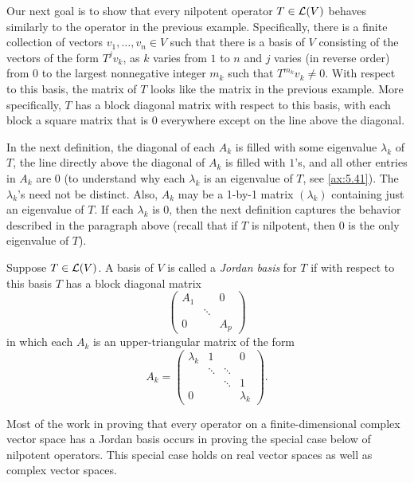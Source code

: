 Our next goal is to show that every nilpotent operator $T\in\mathcal{L}(V)$ behaves
similarly to the operator in the previous example. Specifically, there is a
finite collection of vectors $v_1,\dots,v_n\in V$ such that there is a basis of
$V$ consisting of the vectors of the form $T^jv_k$, as $k$ varies from $1$ to
$n$ and $j$ varies (in reverse order) from $0$ to the largest nonnegative
integer $m_k$ such that $T^{m_k}v_k\ne0$. With respect to this basis, the matrix
of $T$ looks like the matrix in the previous example. More specifically, $T$
has a block diagonal matrix with respect to this basis, with each block a
square matrix that is $0$ everywhere except on the line above the diagonal.

In the next definition, the diagonal of each $A_k$ is filled with some
eigenvalue $\lambda_k$ of $T$, the line directly above the diagonal of $A_k$ is
filled with $1$'s, and all other entries in $A_k$ are $0$ (to understand why
each $\lambda_k$ is an eigenvalue of $T$, see \ref{ax:5.41}). The
$\lambda_k$'s need not be distinct. Also, $A_k$ may be a 1-by-1 matrix
$(\lambda_k)$ containing just an eigenvalue of $T$. If each $\lambda_k$ is $0$,
then the next definition captures the behavior described in the paragraph above
(recall that if $T$ is nilpotent, then $0$ is the only eigenvalue of $T$).

\begin{definition}\label{ax:8.44}
Suppose $T\in\mathcal{L}(V)$. A basis of $V$ is called a \emph{Jordan basis} for $T$
if with respect to this basis $T$ has a block diagonal matrix
\[ \begin{pmatrix}
A_1 & & 0\\
& \ddots & \\
0 & & A_p
\end{pmatrix} \]
in which each $A_k$ is an upper-triangular matrix of the form
\[ A_k = \begin{pmatrix}
\lambda_k & 1 & & 0\\
& \ddots & \ddots & \\
& & \ddots & 1\\
0 & & & \lambda_k
\end{pmatrix}. \]
\end{definition}

Most of the work in proving that every operator on a finite-dimensional complex
vector space has a Jordan basis occurs in proving the special case below of
nilpotent operators. This special case holds on real vector spaces as well as
complex vector spaces.

